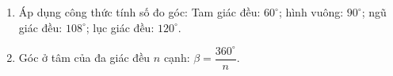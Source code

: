 \begin{enumerate}
\item Áp dụng công thức tính số đo góc: Tam giác đều: $60^\circ$; hình vuông: $90^\circ$; ngũ giác đều: $108^\circ$; lục giác đều: $120^\circ$.
\item Góc ở tâm của đa giác đều $n$ cạnh: $\boxed{\beta = \dfrac{360^\circ}{n}}$.
\end{enumerate}
